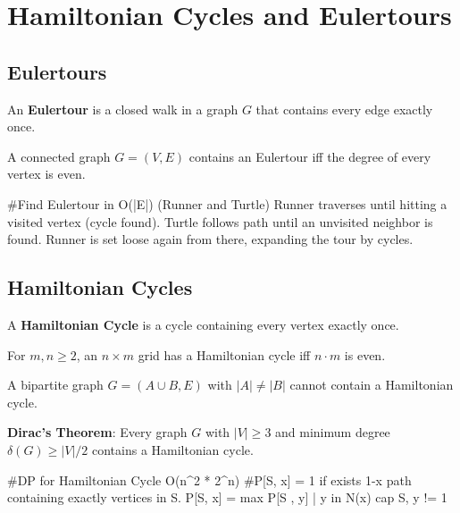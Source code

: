 \section{Hamiltonian Cycles and Eulertours}

\subsection{Eulertours}

\begin{definition}
An \textbf{Eulertour} is a closed walk in a graph $G$ that contains every edge exactly once.
\end{definition}

\begin{theorem}
A connected graph $G = (V, E)$ contains an Eulertour iff the degree of every vertex is even.
\end{theorem}

\begin{algorithm}
#Find Eulertour in O(|E|) (Runner and Turtle)
Runner traverses until hitting a visited vertex (cycle found).
Turtle follows path until an unvisited neighbor is found.
Runner is set loose again from there, expanding the tour by cycles.
\end{algorithm}

\subsection{Hamiltonian Cycles}

\begin{definition}
A \textbf{Hamiltonian Cycle} is a cycle containing every vertex exactly once.
\end{definition}

\begin{theorem}
For $m, n \ge 2$, an $n \times m$ grid has a Hamiltonian cycle iff $n \cdot m$ is even.
\end{theorem}

\begin{theorem}
A bipartite graph $G = (A \cup B, E)$ with $|A| \neq |B|$ cannot contain a Hamiltonian cycle.
\end{theorem}

\begin{theorem}
\textbf{Dirac's Theorem}: Every graph $G$ with $|V| \ge 3$ and minimum degree $\delta(G) \ge |V|/2$ contains a Hamiltonian cycle.
\end{theorem}

\begin{algorithm}
#DP for Hamiltonian Cycle O(n^2 * 2^n)
#P[S, x] = 1 if exists 1-x path containing exactly vertices in S.
P[S, x] = max { P[S , y] | y in N(x) cap S, y != 1 }
\end{algorithm}

